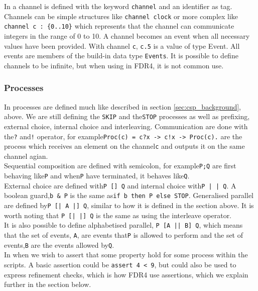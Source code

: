 In \cspm a channel is defined with the keyword \texttt{channel} and an identifier as tag. Channels can be simple structures like \texttt{channel clock} or more complex like \texttt{channel c : \{0..10\}} which represents that the channel can communicate integers in the range of 0 to 10. A channel becomes an event when all necessary values have been provided. With channel \texttt{c}, \texttt{c.5} is a value of type Event. All events are members of the build-in data type \texttt{Events}. It is possible to define channels to be infinite, but when using \cspm in FDR4, it is not common use. \\

\subsubsection{\cspm Processes}
In \cspm processes are defined much like described in section \ref{sec:csp_background}, above. We are still defining the \texttt{SKIP} and the\texttt{STOP} processes as well as prefixing, external choice, internal choice and interleaving. Communication are done with the\texttt{?} and\texttt{!} operator, for example\texttt{Proc(c) = c?x -> c!x -> Proc(c).} are the process which receives an element on the channel\texttt{c} and outputs it on the same channel agian. \\
Sequential composition are defined with semicolon, for example\texttt{P;Q} are first behaving like\texttt{P} and when\texttt{P} have terminated, it behaves like\texttt{Q}. \\
External choice are defined with\texttt{P [] Q} and internal choice with\texttt{P |~| Q}. A boolean guard,\texttt{b \& P} is the same as\texttt{if b then P else STOP}.
Generalised parallel are defined by\texttt{P [| A |] Q}, similar to how it is defined in the section above. It is worth noting that \texttt{P [| {} |] Q} is the same as using the interleave operator. \\
It is also possible to define alphabetised parallel, \texttt{P [A || B] Q}, which means that the set of events, \texttt{A}, are events that\texttt{P} is allowed to perform and the set of events,\texttt{B} are the events allowed by\texttt{Q}.\\
In \cspm when we wish to assert that some property hold for some process within the \cspm scripts. A basic assertion could be \texttt{assert 4 < 9}, but could also be used to express refinement checks, which is how FDR4 use assertions, which we explain further in the section below.\\

